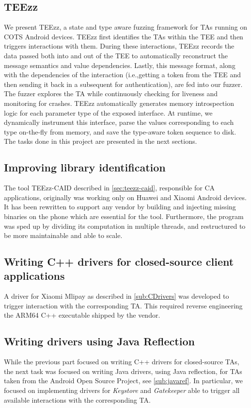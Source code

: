\documentclass[a4paper,11pt,oneside]{article}
\begin{document}
\subsection{TEEzz}
We present TEEzz, a state and type aware fuzzing framework for TAs running on COTS Android devices.
TEEzz first identifies the TAs
within the TEE and then triggers interactions with
them. During these interactions, TEEzz records the data passed
both into and out of the TEE to automatically reconstruct the
message semantics and value dependencies.
Lastly, this message format, along with the dependencies of
the interaction (i.e.,getting a token from the TEE and then sending it back in a subsequent for authentication), are fed into our fuzzer. The fuzzer
explores the TA while continuously checking for liveness and
monitoring for crashes.
TEEzz automatically generates
memory introspection logic for each parameter type of the
exposed interface. At runtime, we dynamically
instrument this interface, parse the values corresponding to
each type on-the-fly from memory, and save the type-aware
token sequence to disk.
The tasks done in this project are presented in the next sections.
\subsection{Improving library identification}
The tool TEEzz-CAID described in \autoref{sec:teezz-caid}, responsible for CA applications, originally was working only on Huawei and Xiaomi Android devices. It has been rewritten to support any vendor by building and
injecting missing binaries on the phone which are essential for the tool.
Furthermore, the program was sped up by dividing its computation in multiple
threads, and restructured to be more maintainable and able to scale.
\subsection{Writing C++ drivers for closed-source client applications}
A driver for Xiaomi Mlipay as described in \autoref{sub:CDrivers} was developed to trigger interaction with the corresponding TA. This required reverse engineering the ARM64 C++ executable shipped by the vendor.
\subsection{Writing drivers using Java Reflection}
While the previous part focused on writing C++ drivers for closed-source TAs, the next task was focused on writing Java drivers, using Java reflection, for TAs taken from the Android Open Source Project, see \autoref{sub:javaref}.
In particular, we focused on implementing drivers for \emph{Keystore} and \emph{Gatekeeper} able to trigger all available interactions with the corresponding TA.
\end{document}
